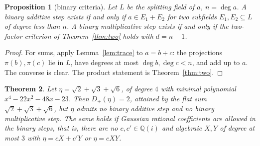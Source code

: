 \documentclass[11pt,a4paper]{article}
\newtheorem{theorem}{Theorem}[section]
\newtheorem{proposition}[theorem]{Proposition}
\theoremstyle{definition}
\theoremstyle{remark}
\newcommand{\Q}{\mathbb{Q}}
\newcommand{\dg}{\deg}
\newcommand{\Dp}{D_{+}}
\begin{document}
\begin{proposition}[binary criteria]\label{prop:binary}
Let $L$ be the splitting field of $a$, $n=\dg a$.  A binary additive step exists if and only if
$a\in E_1+E_2$ for two subfields $E_1,E_2\subseteq L$ of degree less than $n$.  A binary multiplicative
step exists if and only if the two-factor criterion of Theorem~\ref{thm:two} holds with $d=n-1$.
\end{proposition}

\begin{proof}
For sums, apply Lemma~\ref{lem:trace} to $a=b+c$: the projections $\pi(b),\pi(c)$ lie in $L$, have
degrees at most $\dg b,\dg c<n$, and add up to $a$.  The converse is clear.  The product statement is
Theorem~\ref{thm:two}.
\end{proof}

\begin{theorem}\label{thm:flat}
Let $\eta=\sqrt2+\sqrt3+\sqrt6$, of degree $4$ with minimal polynomial $x^4-22x^2-48x-23$.  Then
$\Dp(\eta)=2$, attained by the flat sum $\sqrt2+\sqrt3+\sqrt6$, but $\eta$ admits no binary additive
step and no binary multiplicative step.  The same holds if Gaussian rational coefficients are allowed in
the binary steps, that is, there are no $c,c'\in\Q(i)$ and algebraic $X,Y$ of degree at most $3$ with
$\eta=cX+c'Y$ or $\eta=cXY$.
\end{theorem}
\end{document}
